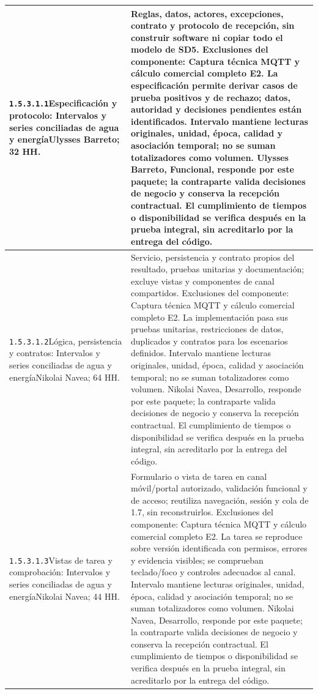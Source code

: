 \begin{longtable}{L{52mm}L{91mm}}
\texttt{1.\allowbreak{}5.\allowbreak{}3.\allowbreak{}1.\allowbreak{}1}\newline Especificación y protocolo: Intervalos y series conciliadas de agua y energía\newline Ulysses Barreto; 32 HH. & Reglas, datos, actores, excepciones, contrato y protocolo de recepción, sin construir software ni copiar todo el modelo de SD5. Exclusiones del componente: Captura técnica MQTT y cálculo comercial completo E2. La especificación permite derivar casos de prueba positivos y de rechazo; datos, autoridad y decisiones pendientes están identificados. Intervalo mantiene lecturas originales, unidad, época, calidad y asociación temporal; no se suman totalizadores como volumen. Ulysses Barreto, Funcional, responde por este paquete; la contraparte valida decisiones de negocio y conserva la recepción contractual. El cumplimiento de tiempos o disponibilidad se verifica después en la prueba integral, sin acreditarlo por la entrega del código.\\\hline
\texttt{1.\allowbreak{}5.\allowbreak{}3.\allowbreak{}1.\allowbreak{}2}\newline Lógica, persistencia y contratos: Intervalos y series conciliadas de agua y energía\newline Nikolai Navea; 64 HH. & Servicio, persistencia y contrato propios del resultado, pruebas unitarias y documentación; excluye vistas y componentes de canal compartidos. Exclusiones del componente: Captura técnica MQTT y cálculo comercial completo E2. La implementación pasa sus pruebas unitarias, restricciones de datos, duplicados y contratos para los escenarios definidos. Intervalo mantiene lecturas originales, unidad, época, calidad y asociación temporal; no se suman totalizadores como volumen. Nikolai Navea, Desarrollo, responde por este paquete; la contraparte valida decisiones de negocio y conserva la recepción contractual. El cumplimiento de tiempos o disponibilidad se verifica después en la prueba integral, sin acreditarlo por la entrega del código.\\\hline
\texttt{1.\allowbreak{}5.\allowbreak{}3.\allowbreak{}1.\allowbreak{}3}\newline Vistas de tarea y comprobación: Intervalos y series conciliadas de agua y energía\newline Nikolai Navea; 44 HH. & Formulario o vista de tarea en canal móvil/portal autorizado, validación funcional y de acceso; reutiliza navegación, sesión y cola de 1.7, sin reconstruirlos. Exclusiones del componente: Captura técnica MQTT y cálculo comercial completo E2. La tarea se reproduce sobre versión identificada con permisos, errores y evidencia visibles; se comprueban teclado/foco y controles adecuados al canal. Intervalo mantiene lecturas originales, unidad, época, calidad y asociación temporal; no se suman totalizadores como volumen. Nikolai Navea, Desarrollo, responde por este paquete; la contraparte valida decisiones de negocio y conserva la recepción contractual. El cumplimiento de tiempos o disponibilidad se verifica después en la prueba integral, sin acreditarlo por la entrega del código.\\\hline

\end{longtable}

